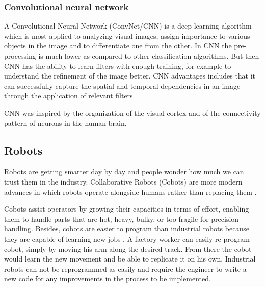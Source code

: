 






\subsubsection*{Convolutional neural network}

A Convolutional Neural Network (ConvNet/CNN) is a deep learning algorithm which is most applied to analyzing visual images, assign importance to various objects in the image and to differentiate one from the other. In CNN the pre-processing is much lower as compared to other classification algorithms. But then CNN has the ability to learn filters with enough training, for example to understand the refinement of the image better. CNN advantages includes that it can successfully capture the spatial and temporal dependencies in an image through the application of relevant filters.


CNN was inspired by the organization of the visual cortex and of the connectivity pattern of neurons in the human brain.



\subsection{Robots}
Robots are getting smarter day by day and people wonder how much we can trust them in the industry. Collaborative Robots (Cobots) are more modern advances in which robots operate alongside humans rather than replacing them \cite{pickett_dont_2018}. 

Cobots assist operators by growing their capacities in terms of effort, enabling them to handle parts that are hot, heavy, bulky, or too fragile for precision handling. Besides, cobots are easier to program than industrial robots because they are capable of learning new jobs \cite{schmidbauer_teaching_2020}. A factory worker can easily re-program cobot, simply by moving his arm along the desired track. From there the cobot would learn the new movement and be able to replicate it on his own. Industrial robots can not be reprogrammed as easily and require the engineer to write a new code for any improvements in the process to be implemented.

